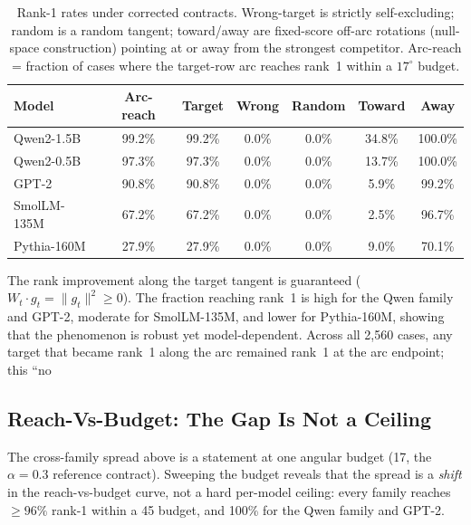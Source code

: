 \documentclass{article}
\begin{document}
\begin{table}[h]
\centering
\begin{tabular}{lcccccc}
\toprule
Model & Arc-reach & Target & Wrong & Random & Toward & Away \\
\midrule
Qwen2-1.5B & 99.2\% & 99.2\% & 0.0\% & 0.0\% & 34.8\% & 100.0\% \\
Qwen2-0.5B & 97.3\% & 97.3\% & 0.0\% & 0.0\% & 13.7\% & 100.0\% \\
GPT-2 & 90.8\% & 90.8\% & 0.0\% & 0.0\% & 5.9\% & 99.2\% \\
SmolLM-135M & 67.2\% & 67.2\% & 0.0\% & 0.0\% & 2.5\% & 96.7\% \\
Pythia-160M & 27.9\% & 27.9\% & 0.0\% & 0.0\% & 9.0\% & 70.1\% \\
\bottomrule
\end{tabular}
\caption{Rank-1 rates under corrected contracts. Wrong-target is strictly
self-excluding; random is a random tangent; toward/away are fixed-score
off-arc rotations (null-space construction) pointing at or away from the
strongest competitor. Arc-reach = fraction of cases where the target-row arc
reaches rank~1 within a $17^\circ$ budget.}
\label{tab:cross-family}
\end{table}

The rank improvement along the target tangent is guaranteed ($W_t \cdot g_t =
\|g_t\|^2 \geq 0$). The fraction reaching rank~1 is high for the Qwen family
and GPT-2, moderate for SmolLM-135M, and lower for Pythia-160M, showing that the
phenomenon is robust yet model-dependent. Across all 2,560 cases, any target
that became rank~1 along the arc remained rank~1 at the arc endpoint; this ``no
\subsection{Reach-Vs-Budget: The Gap Is Not a Ceiling}

The cross-family spread above is a statement at one angular budget
(17\textdegree{}, the $\alpha=0.3$ reference contract). Sweeping the budget reveals
that the spread is a \emph{shift} in the reach-vs-budget curve, not a hard
per-model ceiling: every family reaches $\geq 96\%$ rank-1 within a
45\textdegree{} budget, and 100\% for the Qwen family and GPT-2.
\end{document}
